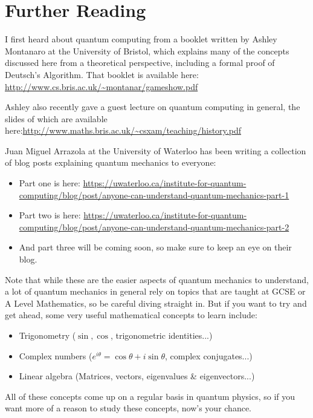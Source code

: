 \documentclass[twocolumn]{article}
\begin{document}
\section{Further Reading}

I first heard about quantum computing from a booklet written by Ashley Montanaro at the University of Bristol, which explains many of the concepts discussed here from a theoretical perspective, including a formal proof of Deutsch's Algorithm. That booklet is available here: \url{http://www.cs.bris.ac.uk/~montanar/gameshow.pdf}

Ashley also recently gave a guest lecture on quantum computing in general, the slides of which are available here:\url{http://www.maths.bris.ac.uk/~csxam/teaching/history.pdf}

Juan Miguel Arrazola at the University of Waterloo has been writing a collection of blog posts explaining quantum mechanics to everyone:

\begin{itemize}
\item Part one is here: \url{https://uwaterloo.ca/institute-for-quantum-computing/blog/post/anyone-can-understand-quantum-mechanics-part-1}
\item Part two is here: \url{https://uwaterloo.ca/institute-for-quantum-computing/blog/post/anyone-can-understand-quantum-mechanics-part-2}
\item And part three will be coming soon, so make sure to keep an eye on their blog.
\end{itemize}

Note that while these are the easier aspects of quantum mechanics to understand, a lot of quantum mechanics in general rely on topics that are taught at GCSE or A Level Mathematics, so be careful diving straight in. But if you want to try and get ahead, some very useful mathematical concepts to learn include:

\begin{itemize}
\item Trigonometry ($\sin, \cos$, trigonometric identities...)
\item Complex numbers ($e^{i\theta} = \cos\theta + i\sin\theta$, complex conjugates...)
\item Linear algebra (Matrices, vectors, eigenvalues \& eigenvectors...)
\end{itemize}

All of these concepts come up on a regular basis in quantum physics, so if you want more of a reason to study these concepts, now's your chance.
\end{document}
